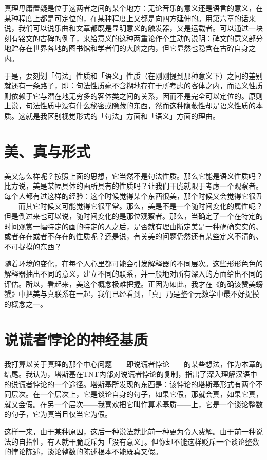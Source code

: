 \documentclass[
  12pt,
  twoside,
  openright,
  oldfontcommands,
]{memoir}
\begin{document}
真理毋庸置疑是位于这两者之间的某个地方：无论音乐的意义还是语言的意义，在某种程度上都是可定位的，在某种程度上又都是向四方延伸的。用第六章的话来说，我们可以说乐曲和文章都既是显明意义的触发器，又是运载者。可以通过一块刻有铭文的古碑的例子，来给意义的这种两重论作个生动的说明：碑文的意义部分地贮存在世界各地的图书馆和学者们的大脑之内，但它显然也隐含在古碑自身之内。

于是，要刻划「句法」性质和「语义」性质（在刚刚提到那种意义下）之间的差别就还有一条路子，即：句法性质毫不含糊地存在于所考虑的客体之内，而语义性质则依赖于它与潜在地无穷多的客体类之间的关系，因而不是完全可以定位的。原则上说，句法性质中没有什么秘密或隐藏的东西，然而这种隐蔽性却是语义性质的本质。这就是我区别视觉形式的「句法」方面和「语义」方面的理由。

\section{美、真与形式}

美又怎么样呢？按照上面的思想，它当然不是句法性质。那么它能是语义性质吗？比方说，美是某幅具体的画所具有的性质吗？让我们干脆就限于考虑一个观察者。每个人都有过这样的经验：这个时候觉得某个东西很美，那个时候又会觉得它很丑------而其它时候又可能觉得它很平常。那么，美是不是一个随时间变化的属性呢？但是倒过来也可以说，随时间变化的是那位观察者。那么，当确定了一个在特定的时间观赏一幅特定的画的特定的人之后，是否就有理由断定美是一种确确实实的、或者存在或者不存在的性质呢？还是说，有关美的问题仍然还有某些定义不清的、不可捉摸的东西？

随着环境的变化，在每个人心里都可能会引发解释器的不同层次。这些形形色色的解释器抽出不同的意义，建立不同的联系，并一般地对所有深入的方面给出不同的评估。所以，看起来，美这个概念极难把握。正因为如此，我才在《的确该赞美螃蟹》中把美与真联系在一起，我们已经看到，「真」乃是整个元数学中最不好捉摸的概念之一。

\section{说谎者悖论的神经基质}

我打算以关于真理的那个中心问题------即说谎者悖论------的某些想法，作为本章的结尾。我认为，塔斯基在TNT内部对说谎者悖论的复制，指出了深入理解汉语中的说谎者悖论的一个途径。塔斯基所发现的东西是：该悖论的塔斯基形式有两个不同层次。在一个层次上，它是谈论自身的句子，如果它假，那就会真，如果它真，就又会假。在另一个层次------我喜欢把它叫作算术基质------上，它是一个谈论整数的句子，它为真当且仅当它为假。

这样一来，由于某种原因，这后一种说法就比前一种更为令人费解。由于前一种说法的自指性，有人就干脆贬斥为「没有意义」。但你却不能这样贬斥一个谈论整数的悖论陈述，谈论整数的陈述根本不能既真又假。
\end{document}
